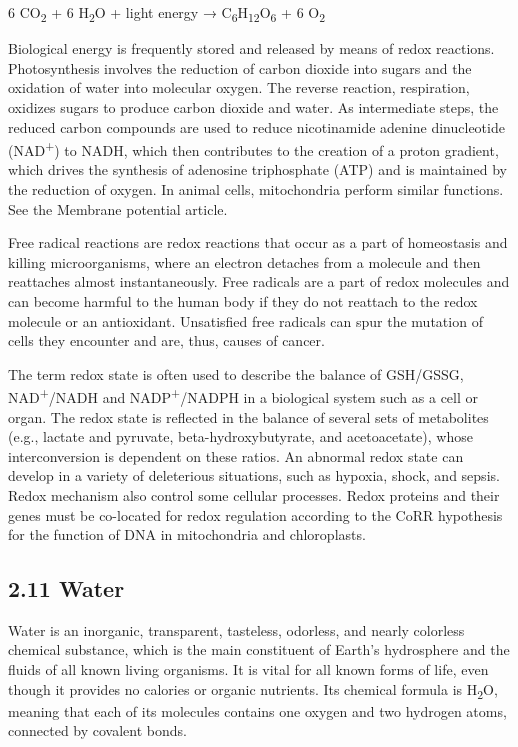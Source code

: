 \documentclass[
]{article}
\theoremstyle{definition}
\theoremstyle{definition}
\theoremstyle{definition}
\theoremstyle{remark}
\begin{document}
6 CO\textsubscript{2} + 6 H\textsubscript{2}O + light energy →
C\textsubscript{6}H\textsubscript{12}O\textsubscript{6} + 6
O\textsubscript{2}

Biological energy is frequently stored and released by means of redox
reactions. Photosynthesis involves the reduction of carbon dioxide into
sugars and the oxidation of water into molecular oxygen. The reverse
reaction, respiration, oxidizes sugars to produce carbon dioxide and
water. As intermediate steps, the reduced carbon compounds are used to
reduce nicotinamide adenine dinucleotide (NAD\textsuperscript{+}) to
NADH, which then contributes to the creation of a proton gradient, which
drives the synthesis of adenosine triphosphate (ATP) and is maintained
by the reduction of oxygen. In animal cells, mitochondria perform
similar functions. See the Membrane potential article.

Free radical reactions are redox reactions that occur as a part of
homeostasis and killing microorganisms, where an electron detaches from
a molecule and then reattaches almost instantaneously. Free radicals are
a part of redox molecules and can become harmful to the human body if
they do not reattach to the redox molecule or an antioxidant.
Unsatisfied free radicals can spur the mutation of cells they encounter
and are, thus, causes of cancer.

The term redox state is often used to describe the balance of GSH/GSSG,
NAD\textsuperscript{+}/NADH and NADP\textsuperscript{+}/NADPH in a
biological system such as a cell or organ. The redox state is reflected
in the balance of several sets of metabolites (e.g., lactate and
pyruvate, beta-hydroxybutyrate, and acetoacetate), whose interconversion
is dependent on these ratios. An abnormal redox state can develop in a
variety of deleterious situations, such as hypoxia, shock, and sepsis.
Redox mechanism also control some cellular processes. Redox proteins and
their genes must be co-located for redox regulation according to the
CoRR hypothesis for the function of DNA in mitochondria and
chloroplasts.

\hypertarget{water}{%
\subsection{\texorpdfstring{{2.11} Water}{2.11 Water}}\label{water}}

Water is an inorganic, transparent, tasteless, odorless, and nearly
colorless chemical substance, which is the main constituent of Earth's
hydrosphere and the fluids of all known living organisms. It is vital
for all known forms of life, even though it provides no calories or
organic nutrients. Its chemical formula is H\textsubscript{2}O, meaning
that each of its molecules contains one oxygen and two hydrogen atoms,
connected by covalent bonds.
\end{document}
